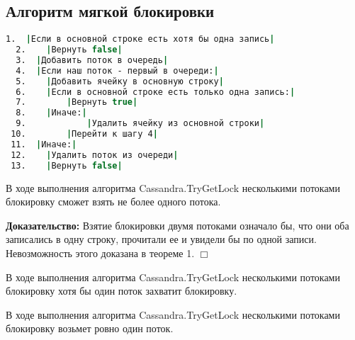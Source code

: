 \subsection{Алгоритм мягкой блокировки}

\begin{lstlisting}[language=csh,caption={Алгоритм Cassandra.TryGetLock(lockId, threadId)}]
  1.  |Если в основной строке есть хотя бы одна запись|
  2.  	|Вернуть false|
  3.  |Добавить поток в очередь|
  4.  |Если наш поток - первый в очереди:|
  5.  	|Добавить ячейку в основную строку|
  6.  	|Если в основной строке есть только одна запись:|
  7.  		|Вернуть true|
  8.  	|Иначе:|
  9.  			|Удалить ячейку из основной строки|
 10.  		|Перейти к шагу 4|
 11.  |Иначе:|
 12.  	|Удалить поток из очереди|
 13.  	|Вернуть false|
\end{lstlisting}

\begin{theorem}
В ходе выполнения алгоритма Cassandra.TryGetLock несколькими потоками блокировку сможет взять не более одного потока.
\end{theorem}
\textbf{Доказательство:}
Взятие блокировки двумя потоками означало бы, что они оба записались в одну строку, прочитали ее и увидели бы по одной записи. Невозможность этого доказана в теореме 1.
$\Box$

\begin{theorem}
В ходе выполнения алгоритма Cassandra.TryGetLock несколькими потоками блокировку хотя бы один поток захватит блокировку.
\end{theorem}

\begin{theorem}
В ходе выполнения алгоритма Cassandra.TryGetLock несколькими потоками блокировку возьмет ровно один поток.
\end{theorem}